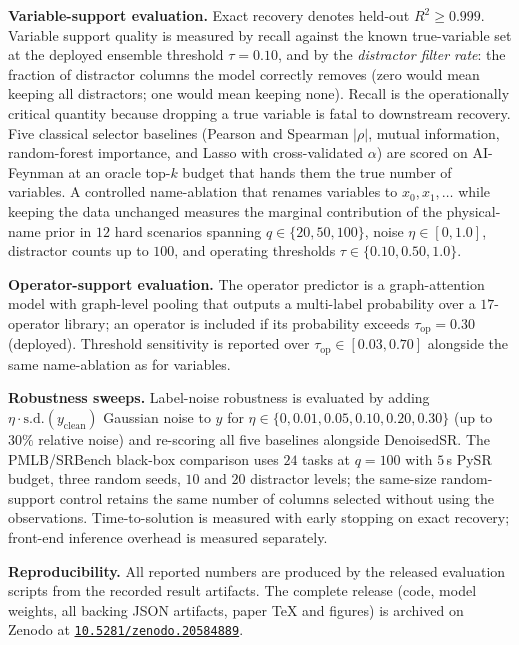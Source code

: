 \documentclass[11pt]{article}
\begin{document}
\noindent\textbf{Variable-support evaluation.} Exact recovery denotes held-out
$R^2\ge0.999$. Variable support quality is measured by recall against the known
true-variable set at the deployed ensemble threshold $\tau=0.10$, and by the
\emph{distractor filter rate}: the fraction of distractor columns the model
correctly removes (zero would mean keeping all distractors; one would mean
keeping none). Recall is the operationally critical quantity because dropping a
true variable is fatal to downstream recovery. Five classical selector baselines
(Pearson and Spearman $|{\rho}|$, mutual information, random-forest importance,
and Lasso with cross-validated $\alpha$) are scored on AI-Feynman at an oracle
top-$k$ budget that hands them the true number of variables. A controlled
name-ablation that renames variables to $x_0,x_1,\dots$ while keeping the data
unchanged measures the marginal contribution of the physical-name prior in $12$
hard scenarios spanning $q\in\{20,50,100\}$, noise $\eta\in[0,1.0]$, distractor
counts up to $100$, and operating thresholds $\tau\in\{0.10,0.50,1.0\}$.

\noindent\textbf{Operator-support evaluation.} The operator predictor is a
graph-attention model with graph-level pooling that outputs a multi-label
probability over a $17$-operator library; an operator is included if its
probability exceeds $\tau_{\mathrm{op}}=0.30$ (deployed). Threshold sensitivity
is reported over $\tau_{\mathrm{op}}\in[0.03,0.70]$ alongside the same
name-ablation as for variables.

\noindent\textbf{Robustness sweeps.} Label-noise robustness is evaluated by
adding $\eta\cdot\mathrm{s.d.}(y_{\mathrm{clean}})$ Gaussian noise to $y$ for
$\eta\in\{0,0.01,0.05,0.10,0.20,0.30\}$ (up to $30\%$ relative noise) and
re-scoring all five baselines alongside DenoisedSR. The PMLB/SRBench black-box
comparison uses $24$ tasks at $q=100$ with $5$\,s PySR budget, three random
seeds, $10$ and $20$ distractor levels; the same-size random-support control
retains the same number of columns selected without using the observations.
Time-to-solution is measured with early stopping on exact recovery; front-end
inference overhead is measured separately.

\noindent\textbf{Reproducibility.} All reported numbers are produced by the
released evaluation scripts from the recorded result artifacts. The complete
release (code, model weights, all backing JSON artifacts, paper TeX and
figures) is archived on Zenodo at
\href{https://doi.org/10.5281/zenodo.20584889}{\nolinkurl{10.5281/zenodo.20584889}}.
\end{document}
